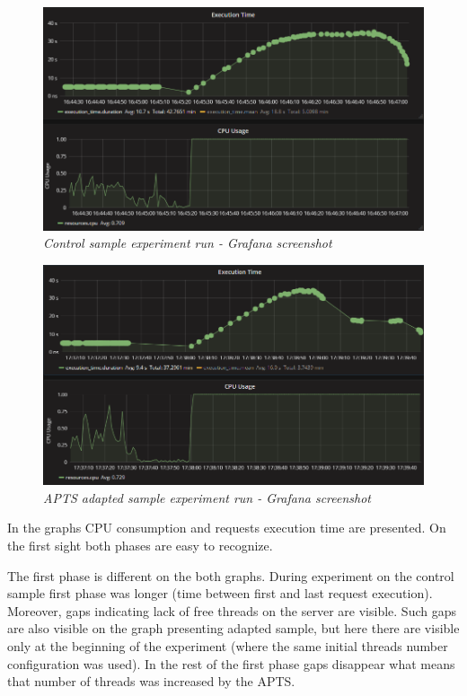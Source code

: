 \documentclass[12pt,a4paper]{article}
\begin{document}
\begin{figure}[!htb]
\centering
\includegraphics[width=1\textwidth]{threadsCtrl}
\caption{\textit{Control sample experiment run - Grafana screenshot}} \label{figure:threads:screen:control}
\end{figure}
\begin{figure}[!htb]
\centering
\includegraphics[width=1\textwidth]{threadsEval}
\caption{\textit{APTS adapted sample experiment run - Grafana screenshot}} \label{figure:threads:screen:adapted}
\end{figure}

In the graphs CPU consumption and requests execution time are presented. On the first sight both phases are easy to recognize.

The first phase is different on the both graphs. During experiment on the control sample first phase was longer (time between first and last request execution). Moreover, gaps indicating lack of free threads on the server are visible. Such gaps are also visible on the graph presenting adapted sample, but here there are visible only at the beginning of the experiment (where the same initial threads number configuration was used). In the rest of the first phase gaps disappear what means that number of threads was increased by the APTS. 
\end{document}
